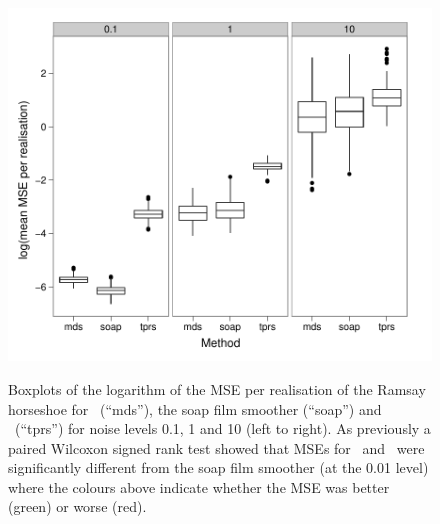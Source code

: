 \begin{figure}
\centering
\includegraphics[width=6in]{mds/figs/mds-ramsay-boxplot.pdf} \\
\caption{Boxplots of the logarithm of the MSE per realisation of the Ramsay horseshoe for \mdsap\ (``mds''), the soap film smoother (``soap'') and \tprs\ (``tprs'') for noise levels 0.1, 1 and 10 (left to right). As previously a paired Wilcoxon signed rank test showed that MSEs for \mdsap\ and \tprs\ were significantly different from the soap film smoother (at the 0.01 level) where the colours above indicate whether the MSE was better (green) or worse (red).}
\label{mds-ramsay-boxplot}
\end{figure}

